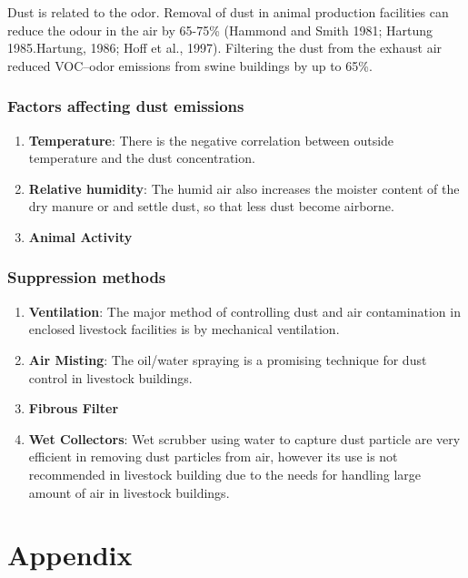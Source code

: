 \documentclass[]{book}
\providecommand{\tightlist}{%
  \setlength{\itemsep}{0pt}\setlength{\parskip}{0pt}}
\begin{document}
Dust is related to the odor. Removal of dust in animal production
facilities can reduce the odour in the air by 65-75\% (Hammond and Smith
1981; Hartung 1985.Hartung, 1986; Hoff et al., 1997). Filtering the dust
from the exhaust air reduced VOC--odor emissions from swine buildings by
up to 65\%.

\subsubsection{Factors affecting dust
emissions}\label{factors-affecting-dust-emissions}

\begin{enumerate}
\def\labelenumi{\arabic{enumi}.}
\tightlist
\item
  \textbf{Temperature}: There is the negative correlation between
  outside temperature and the dust concentration.
\item
  \textbf{Relative humidity}: The humid air also increases the moister
  content of the dry manure or and settle dust, so that less dust become
  airborne.
\item
  \textbf{Animal Activity}
\end{enumerate}

\subsubsection{Suppression methods}\label{suppression-methods-2}

\begin{enumerate}
\def\labelenumi{\arabic{enumi}.}
\tightlist
\item
  \textbf{Ventilation}: The major method of controlling dust and air
  contamination in enclosed livestock facilities is by mechanical
  ventilation.
\item
  \textbf{Air Misting}: The oil/water spraying is a promising technique
  for dust control in livestock buildings.
\item
  \textbf{Fibrous Filter}
\item
  \textbf{Wet Collectors}: Wet scrubber using water to capture dust
  particle are very efficient in removing dust particles from air,
  however its use is not recommended in livestock building due to the
  needs for handling large amount of air in livestock buildings.
\end{enumerate}

\section{Appendix}\label{appendix-2}
\end{document}
